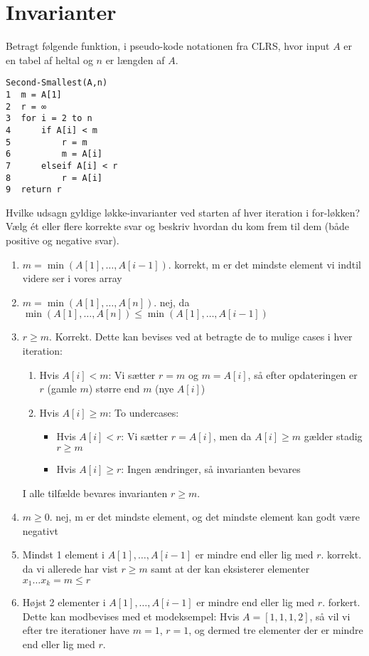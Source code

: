 \documentclass{article}
\theoremstyle{definition}
\begin{document}
\section{Invarianter}
Betragt følgende funktion, i pseudo-kode notationen fra CLRS, hvor input $A$ er en tabel af heltal og $n$ er længden af $A$.

\begin{verbatim}
Second-Smallest(A,n)
1  m = A[1]
2  r = ∞
3  for i = 2 to n
4      if A[i] < m
5          r = m
6          m = A[i]
7      elseif A[i] < r
8          r = A[i]
9  return r
\end{verbatim}

Hvilke udsagn gyldige løkke-invarianter ved starten af hver iteration i for-løkken? Vælg ét eller flere korrekte svar og beskriv hvordan du kom frem til dem (både positive og negative svar).

\begin{enumerate}
    \item $m = \min(A[1],\ldots,A[i-1])$. korrekt, m er det mindste element vi indtil videre ser i vores array
    \item $m = \min(A[1],\ldots,A[n])$. nej, da $\min(A[1],\ldots,A[n]) \leq \min(A[1],\ldots,A[i-1])$
    \item $r \geq m$. Korrekt. Dette kan bevises ved at betragte de to mulige cases i hver iteration:
    \begin{enumerate}
        \item Hvis $A[i] < m$: Vi sætter $r = m$ og $m = A[i]$, så efter opdateringen er $r$ (gamle $m$) større end $m$ (nye $A[i]$)
        \item Hvis $A[i] \geq m$: To undercases:
            \begin{itemize}
                \item Hvis $A[i] < r$: Vi sætter $r = A[i]$, men da $A[i] \geq m$ gælder stadig $r \geq m$
                \item Hvis $A[i] \geq r$: Ingen ændringer, så invarianten bevares
            \end{itemize}
    \end{enumerate}

    I alle tilfælde bevares invarianten $r \geq m$.
    \item $m \geq 0$. nej, m er det mindste element, og det mindste element kan godt være negativt
    \item Mindst 1 element i $A[1],\ldots,A[i-1]$ er mindre end eller lig med $r$. korrekt. da vi allerede har vist $r \geq m$ samt at der kan eksisterer elementer $x_1 \dots x_k = m \leq r$
    \item Højst 2 elementer i $A[1],\ldots,A[i-1]$ er mindre end eller lig med $r$. forkert.
    Dette kan modbevises med et modeksempel: Hvis $A = [1,1,1,2]$, så vil vi efter tre iterationer have $m=1$, $r=1$, 
    og dermed tre elementer der er mindre end eller lig med $r$.
\end{enumerate}
\end{document}
